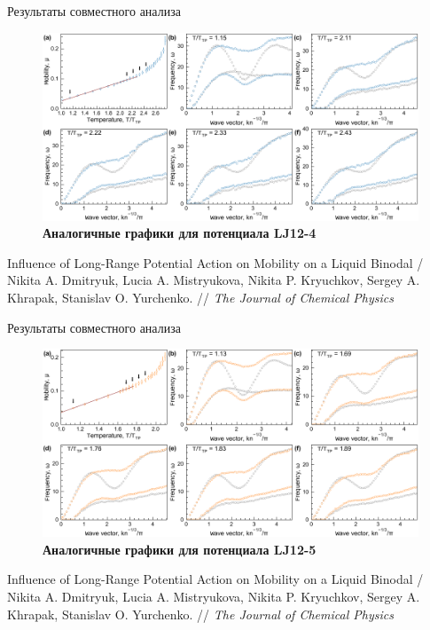\documentclass{beamer} %
\begin{document}
\begin{frame}{Результаты совместного анализа}
  \footnotesize{

    \begin{figure}
      \centering
      \includegraphics[width=\textwidth]{MACR-Figure5}
      \caption{\footnotesize \textbf{Аналогичные графики для потенциала LJ12-4}}
      \label{Figure4}
    \end{figure}

  }

  \tiny{Influence of Long-Range Potential Action on Mobility on a Liquid Binodal / Nikita A. Dmitryuk, Lucia A. Mistryukova, Nikita P. Kryuchkov, Sergey A. Khrapak, Stanislav O. Yurchenko. // \textit{The Journal of Chemical Physics}}
\end{frame}




\begin{frame}{Результаты совместного анализа}
  \footnotesize{

    \begin{figure}
      \centering
      \includegraphics[width=\textwidth]{MACR-Figure6}
      \caption{\footnotesize \textbf{Аналогичные графики для потенциала LJ12-5}}
      \label{Figure4}
    \end{figure}

  }

  \tiny{Influence of Long-Range Potential Action on Mobility on a Liquid Binodal / Nikita A. Dmitryuk, Lucia A. Mistryukova, Nikita P. Kryuchkov, Sergey A. Khrapak, Stanislav O. Yurchenko. // \textit{The Journal of Chemical Physics}}
\end{frame}
\end{document}
